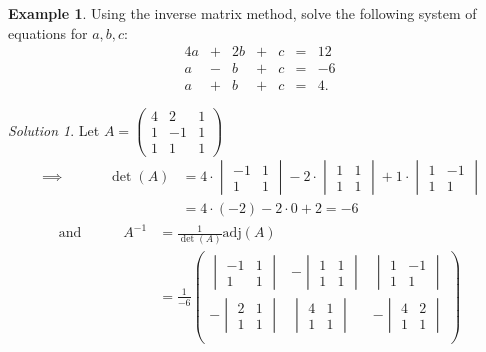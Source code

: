 \documentclass[
  english,
  12pt,
  oneside]{book}
\theoremstyle{definition}
\theoremstyle{definition}
\newtheorem{example}{Example}[chapter]
\theoremstyle{definition}
\theoremstyle{definition}
\theoremstyle{remark}
\newtheorem*{solution}{Solution}
\begin{document}
\begin{example}
Using the inverse matrix method, solve the following system of equations for \(a,b,c\):
\[\begin{matrix}
    4a&+&2b&+&c&=&12\\
     a&-& b&+&c&=&-6\\
     a&+& b&+&c&=&4.
\end{matrix}\]
\end{example}

\begin{solution}
Let \(A=\begin{pmatrix}4&2&1\\1&-1&1\\1&1&1\end{pmatrix}\)
\begin{align*}
\implies\quad\quad\quad \det(A) &= 4\cdot\begin{vmatrix}-1&1\\1&1\end{vmatrix} -2\cdot\begin{vmatrix}1&1\\1&1\end{vmatrix} +1\cdot\begin{vmatrix}1&-1\\1&1\end{vmatrix}\\
&= 4\cdot(-2)-2\cdot0+2=-6
\end{align*}
\begin{align*}
\text{and}\quad\quad\quad A^{-1}
&= \frac{1}{\det(A)}\mathrm{adj}(A) \\
&= \frac{1}{-6}
\begin{pmatrix}
\begin{vmatrix}-1&1\\1&1\end{vmatrix}&-\begin{vmatrix}1&1\\1&1\end{vmatrix}&\begin{vmatrix}1&-1\\1&1\end{vmatrix}\\
-\begin{vmatrix}2&1\\1&1\end{vmatrix}&\begin{vmatrix}4&1\\1&1\end{vmatrix}&-\begin{vmatrix}4&2\\1&1\end{vmatrix}\\

\end{pmatrix}
\end{align*}
\end{solution}
\end{document}
